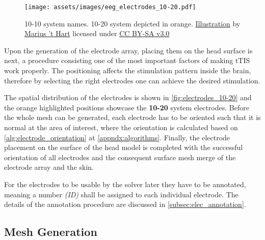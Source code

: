 \begin{wrapfigure}{l}{0.48\textwidth}
    \centering
    \vspace{-15pt}
    \texttt{[image: assets/images/eeg\_electrodes\_10-20.pdf]}
    \caption[10-10 system names. The orange electrodes are used in the 10-20 system.]{10-10 system names. 10-20 system depicted in orange. \href{http://www.mariusthart.net/downloads/eeg_electrodes_10-20.svg}{Illustration} by \href{http://www.beteredingen.nl}{Marius 't Hart} licensed under \href{http://creativecommons.org/licenses/by-sa/3.0/nl/deed.en_GB}{CC BY-SA v3.0}}
    \label{fig:electrodes_10-20}
\end{wrapfigure}

Upon the generation of the electrode array, placing them on the head surface is next, a procedure consisting one of the most important factors of making \gls{tTIS} work properly. The positioning affects the stimulation pattern inside the brain, therefore by selecting the right electrodes one can achieve the desired stimulation.

The spatial distribution of the electrodes is shown in \autoref{fig:electrodes_10-20} and the orange highlighted positions showcase the \textbf{10-20} system electrodes. Before the whole mesh can be generated, each electrode has to be oriented such that it is normal at the area of interest, where the orientation is calculated based on \autoref{alg:electrode_orientation} at \autoref{appndx:algorithms}. Finally, the electrode placement on the surface of the head model is completed with the successful orientation of all electrodes and the consequent surface mesh merge of the electrode array and the skin.

For the electrodes to be usable by the solver later they have to be annotated, meaning a number \textit{(ID)} shall be assigned to each individual electrode. The details of the annotation procedure are discussed in \ref{subsec:elec_annotation}.

\subsection{Mesh Generation}
\label{subsec:mesh_generation}

